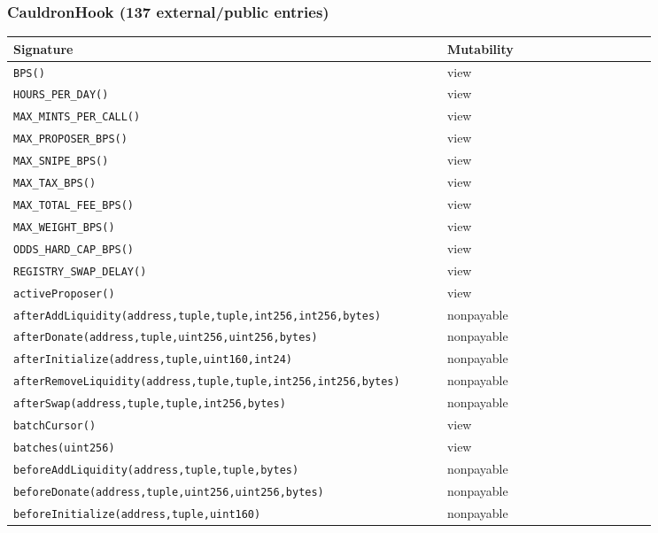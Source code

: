 \subsubsection*{CauldronHook \;\normalfont\small(137 external/public entries)}
\begin{longtable}{@{}p{0.62\linewidth}p{0.30\linewidth}@{}}
\toprule \textbf{Signature} & \textbf{Mutability} \\ \midrule \endhead
\texttt{\scriptsize BPS()} & view \\
\texttt{\scriptsize HOURS\_PER\_DAY()} & view \\
\texttt{\scriptsize MAX\_MINTS\_PER\_CALL()} & view \\
\texttt{\scriptsize MAX\_PROPOSER\_BPS()} & view \\
\texttt{\scriptsize MAX\_SNIPE\_BPS()} & view \\
\texttt{\scriptsize MAX\_TAX\_BPS()} & view \\
\texttt{\scriptsize MAX\_TOTAL\_FEE\_BPS()} & view \\
\texttt{\scriptsize MAX\_WEIGHT\_BPS()} & view \\
\texttt{\scriptsize ODDS\_HARD\_CAP\_BPS()} & view \\
\texttt{\scriptsize REGISTRY\_SWAP\_DELAY()} & view \\
\texttt{\scriptsize activeProposer()} & view \\
\texttt{\scriptsize afterAddLiquidity(address,tuple,tuple,int256,int256,bytes)} & nonpayable \\
\texttt{\scriptsize afterDonate(address,tuple,uint256,uint256,bytes)} & nonpayable \\
\texttt{\scriptsize afterInitialize(address,tuple,uint160,int24)} & nonpayable \\
\texttt{\scriptsize afterRemoveLiquidity(address,tuple,tuple,int256,int256,bytes)} & nonpayable \\
\texttt{\scriptsize afterSwap(address,tuple,tuple,int256,bytes)} & nonpayable \\
\texttt{\scriptsize batchCursor()} & view \\
\texttt{\scriptsize batches(uint256)} & view \\
\texttt{\scriptsize beforeAddLiquidity(address,tuple,tuple,bytes)} & nonpayable \\
\texttt{\scriptsize beforeDonate(address,tuple,uint256,uint256,bytes)} & nonpayable \\
\texttt{\scriptsize beforeInitialize(address,tuple,uint160)} & nonpayable \\

\end{longtable}
